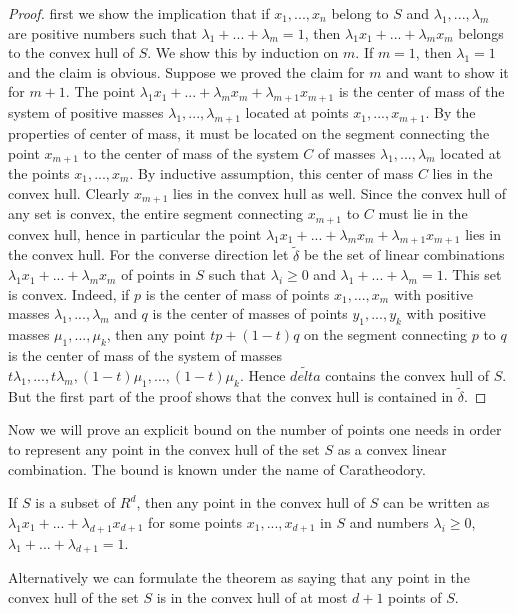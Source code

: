 \begin{proof} first we show the implication that if $x_1,...,x_n$ belong to $S$ and $\lambda_1,...,\lambda_m$ are positive numbers such that $\lambda_1+...+\lambda_m=1$, then $\lambda_1 x_1+...+\lambda_m x_m$ belongs to the convex hull of $S$. We show this by induction on $m$. If $m=1$, then $\lambda_1=1$ and the claim is obvious. Suppose we proved the claim for $m$ and want to show it for $m+1$. The point $\lambda_1 x_1+...+\lambda_m x_m+\lambda_{m+1} x_{m+1}$ is the center of mass of the system of positive masses $\lambda_1,...,\lambda_{m+1}$ located at points $x_1,...,x_{m+1}$. By the properties of center of mass, it must be located on the segment connecting the point $x_{m+1}$ to the center of mass of the system $C$ of masses $\lambda_1,...,\lambda_m$ located at the points $x_1,...,x_m$. By inductive assumption, this center of mass $C$ lies in the convex hull. Clearly $x_{m+1}$ lies in the convex hull as well. Since the convex hull of any set is convex, the entire segment connecting $x_{m+1}$ to $C$ must lie in the convex hull, hence in particular the point $\lambda_1 x_1+...+\lambda_m x_m+\lambda_{m+1} x_{m+1}$ lies in the convex hull.
For the converse direction let $\tilde{\delta}$ be the set of linear combinations $\lambda_1 x_1+...+\lambda_m x_m$ of points in $S$ such that $\lambda_i\ge 0$ and $\lambda_1+...+\lambda_m=1$. This set is convex. Indeed, if $p$ is the center of mass of points $x_1,...,x_m$ with positive masses $\lambda_1,...,\lambda_m$ and $q$ is the center of masses of points $y_1,...,y_k$ with positive masses $\mu_1,...,\mu_k$, then any point $t p+(1-t) q$ on the segment connecting $p$ to $q$ is the center of mass of the system of masses $t\lambda_1,...,t\lambda_m,(1-t)\mu_1,...,(1-t)\mu_{k}$. Hence $\tilde{delta}$ contains the convex hull of $S$. But the first part of the proof shows that the convex hull is contained in $\tilde{\delta}$.
\end{proof}
Now we will prove an explicit bound on the number of points one needs in order to represent any point in the convex hull of the set $S$ as a convex linear combination. The bound is known under the name of Caratheodory.
\begin{theorem}
If $S$ is a subset of $R^d$, then any point in the convex hull of $S$ can be written as $\lambda_1 x_1+...+\lambda_{d+1} x_{d+1}$ for some points $x_1,...,x_{d+1}$ in $S$ and numbers $\lambda_i\ge0$, $\lambda_1+...+\lambda_{d+1} =1$.
\end{theorem}
Alternatively we can formulate the theorem as saying that any point in the convex hull of the set $S$ is in the convex hull of at most $d+1$ points of $S$.
